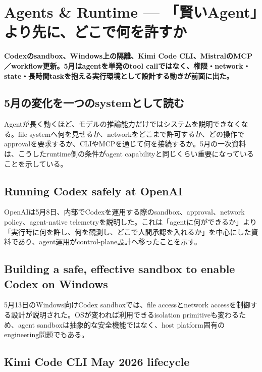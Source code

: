 \section{Agents \& Runtime — 「賢いAgent」より先に、どこで何を許すか}
\label{pkg:agents-runtime-may}
\noindent\textbf{Codexのsandbox、Windows上の隔離、Kimi Code CLI、MistralのMCP／workflow更新。5月はagentを単発のtool callではなく、権限・network・state・長時間taskを抱える実行環境として設計する動きが前面に出た。}\autocite{src-4a3442a5ca8c,src-66be12207714,src-9191d43918fc,src-ac04c00cf21f,src-d8b7c1c36830}

\subsection{5月の変化を一つのsystemとして読む}

Agentが長く動くほど、モデルの推論能力だけではシステムを説明できなくなる。file systemへ何を見せるか、networkをどこまで許可するか、どの操作でapprovalを要求するか、CLIやMCPを通じて何を接続するか。5月の一次資料は、こうしたruntime側の条件がagent capabilityと同じくらい重要になっていることを示している。\autocite{src-4a3442a5ca8c,src-66be12207714,src-9191d43918fc,src-ac04c00cf21f,src-d8b7c1c36830}


\subsection{Running Codex safely at OpenAI}

OpenAIは5月8日、内部でCodexを運用する際のsandbox、approval、network policy、agent-native telemetryを説明した。これは「agentに何ができるか」より「実行時に何を許し、何を観測し、どこで人間承認を入れるか」を中心にした資料であり、agent運用がcontrol-plane設計へ移ったことを示す。\autocite{src-66be12207714}


\subsection{Building a safe, effective sandbox to enable Codex on Windows}

5月13日のWindows向けCodex sandboxでは、file accessとnetwork accessを制御する設計が説明された。OSが変われば利用できるisolation primitiveも変わるため、agent sandboxは抽象的な安全機能ではなく、host platform固有のengineering問題でもある。\autocite{src-4a3442a5ca8c}


\subsection{Kimi Code CLI May 2026 lifecycle}

